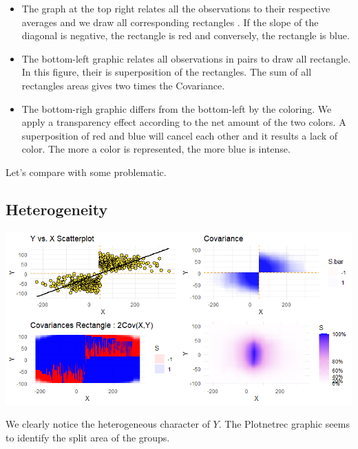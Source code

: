 \documentclass[
]{report}
\begin{document}
\begin{itemize}
\item
  The graph at the top right relates all the observations to their respective averages and we draw all corresponding rectangles . If the slope of the diagonal is negative, the rectangle is red and conversely, the rectangle is blue.
\item
  The bottom-left graphic relates all observations in pairs to draw all rectangle. In this figure, their is superposition of the rectangles. The sum of all rectangles areas gives two times the Covariance.
\item
  The bottom-righ graphic differs from the bottom-left by the coloring. We apply a transparency effect according to the net amount of the two colors. A superposition of red and blue will cancel each other and it results a lack of color. The more a color is represented, the more blue is intense.
\end{itemize}

Let's compare with some problematic.

\hypertarget{heterogeneity}{%
\subsection{Heterogeneity}\label{heterogeneity}}

\vspace{0.6cm}

\begin{minipage}{0.70\textwidth}
    \includegraphics{plotnetrec_heterogeneity.png}
\end{minipage}
\hspace{3.5ex}
\begin{minipage}{0.25\textwidth}
   We clearly notice the heterogeneous character of $Y$. The Plotnetrec graphic seems to identify the split area of the groups.
\end{minipage}
\end{document}
